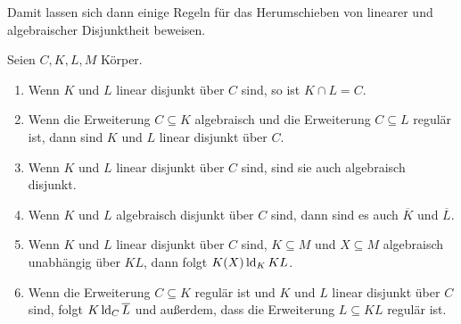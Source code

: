     Damit lassen sich dann einige Regeln für das \glqq{}Herumschieben\grqq{} von linearer und algebraischer Disjunktheit beweisen.
    \begin{lemma}\label{Rechenregeln}
    	Seien $C,K,L,M$ Körper.
    	\begin{enumerate}
    		\item Wenn $K$ und $L$ linear disjunkt über $C$ sind, so ist $K\cap L=C$.
    		\item Wenn die Erweiterung $C\subseteq K$ algebraisch und die Erweiterung $C\subseteq L$ regulär ist, dann sind $K$ und $L$ linear disjunkt über $C$.
    		\item Wenn $K$ und $L$ linear disjunkt über $C$ sind, sind sie auch algebraisch disjunkt.
    		\item Wenn $K$ und $L$ algebraisch disjunkt über $C$ sind, dann sind es auch $\overline{K}$ und $\overline{L}$.
    		\item Wenn $K$ und $L$ linear disjunkt über $C$ sind, $K\subseteq M$ und $X\subseteq M$ algebraisch unabhängig über $KL$, dann folgt $K(X)\operatorname{ld}_KKL$.
    		\item Wenn die Erweiterung $C\subseteq K$ regulär ist und $K$ und $L$ linear disjunkt über $C$ sind, folgt $K\operatorname{ld}_C\overline{L}$ und außerdem, dass die Erweiterung $L\subseteq KL$ regulär ist.
    	\end{enumerate}
    \end{lemma}
